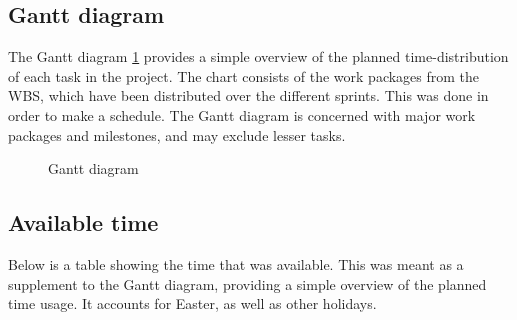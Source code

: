 \subsection{Gantt diagram}
\label{subsec:process_and_methodology-resource_management-gantt_diagram}

The Gantt diagram \ref{fig:gantt} provides a simple overview of the planned time-distribution of each task in the project. The chart consists of the work packages from the WBS, which have been distributed over the different sprints. This was done in order to make a schedule. The Gantt diagram is concerned with major work packages and milestones, and may exclude lesser tasks.

\begin{center}
  \begin{figure}[ht!]
    \caption{Gantt diagram}
    \label{fig:gantt}
  \end{figure}
\end{center}

\subsection{Available time}
\label{subsec:process_and_methodology-resource_management-available_time}

Below is a table showing the time that was available. This was meant as a supplement to the Gantt diagram, providing a simple overview of the planned time usage. It accounts for Easter, as well as other holidays.


